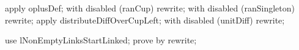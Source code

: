 \begin{LPScript}\begin{forget}[lHomogeneousMidPointExchangeRanEquiv]
apply oplusDef;
with disabled (ranCup) rewrite;
with disabled (ranSingleton) rewrite;
apply distributeDiffOverCupLeft;
with disabled (unitDiff) rewrite;
\end{forget}\end{LPScript}
\begin{forget}
use lNonEmptyLinksStartLinked;
prove by rewrite;
\end{forget}


